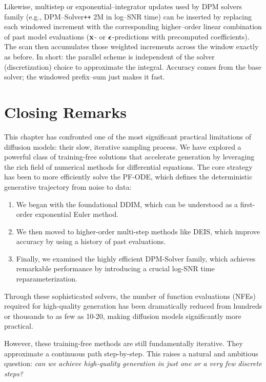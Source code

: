 Likewise, multistep or exponential–integrator updates used by DPM solvers family
(e.g., DPM–Solver\texttt{++} $2$M in log–SNR time) can be inserted by
replacing each windowed increment with the corresponding higher–order linear
combination of past model evaluations (${\mathbf{x}}$- or ${\bm{\epsilon}}$-predictions with precomputed
coefficients). The scan then accumulates those weighted increments across the
window exactly as before. In short: the parallel scheme is independent of the solver (discretization) choice to approximate the integral. Accuracy comes from the base solver; the windowed prefix–sum just makes it fast.

\newpage
\section{Closing Remarks}\label{sec:ch9_cr}

This chapter has confronted one of the most significant practical limitations of diffusion models: their slow, iterative sampling process. We have explored a powerful class of training-free solutions that accelerate generation by leveraging the rich field of numerical methods for differential equations. The core strategy has been to more efficiently solve the PF-ODE, which defines the deterministic generative trajectory from noise to data:
\begin{enumerate}
    \item We began with the foundational DDIM, which can be understood as a first-order exponential Euler method.
    \item We then moved to higher-order multi-step methods like DEIS, which improve accuracy by using a history of past evaluations.
    \item Finally, we examined the highly efficient DPM-Solver family, which achieves remarkable performance by introducing a crucial log-SNR time reparameterization.
\end{enumerate}

Through these sophisticated solvers, the number of function evaluations (NFEs) required for high-quality generation has been dramatically reduced from hundreds or thousands to as few as 10-20, making diffusion models significantly more practical.

However, these training-free methods are still fundamentally iterative. They approximate a continuous path step-by-step. This raises a natural and ambitious question: \emph{can we achieve high-quality generation in just one or a very few discrete steps?}

